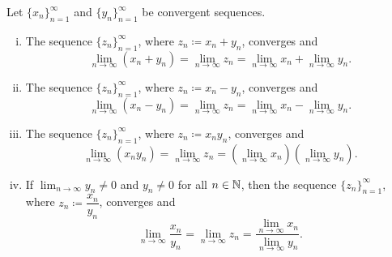 \begin{prop} \label{prop:contalg}
Let $\{ x_n \}_{n=1}^\infty$ and $\{ y_n \}_{n=1}^\infty$ be convergent sequences.
\begin{enumerate}[(i)]
\item \label{prop:contalg:i}
The sequence $\{ z_n \}_{n=1}^\infty$, where $z_n \coloneqq x_n + y_n$, converges and
\begin{equation*}
\lim_{n \to \infty} (x_n + y_n) = 
\lim_{n \to \infty} z_n = 
\lim_{n \to \infty} x_n + 
\lim_{n \to \infty} y_n .
\end{equation*}
\item \label{prop:contalg:ii}
The sequence $\{ z_n \}_{n=1}^\infty$, where $z_n \coloneqq x_n - y_n$, converges and
\begin{equation*}
\lim_{n \to \infty} (x_n - y_n) = 
\lim_{n \to \infty} z_n = 
\lim_{n \to \infty} x_n - 
\lim_{n \to \infty} y_n .
\end{equation*}
\item \label{prop:contalg:iii}
The sequence $\{ z_n \}_{n=1}^\infty$, where $z_n \coloneqq x_n y_n$, converges and
\begin{equation*}
\lim_{n \to \infty} (x_n y_n) = 
\lim_{n \to \infty} z_n = 
\left( \lim_{n \to \infty} x_n \right)
\left( \lim_{n \to \infty} y_n \right) .
\end{equation*}
\item \label{prop:contalg:iv}
If $\lim_{n\to\infty} y_n \neq 0$ and $y_n \neq 0$ for all $n \in {\mathbb{N}}$, then
the sequence $\{ z_n \}_{n=1}^\infty$, where $z_n \coloneqq \dfrac{x_n}{y_n}$, converges and
\begin{equation*}
\lim_{n \to \infty} \frac{x_n}{y_n} = 
\lim_{n \to \infty} z_n = 
\frac{\lim_{n \to \infty} x_n}{\lim_{n \to \infty} y_n} .
\end{equation*}
\end{enumerate}
\end{prop}

